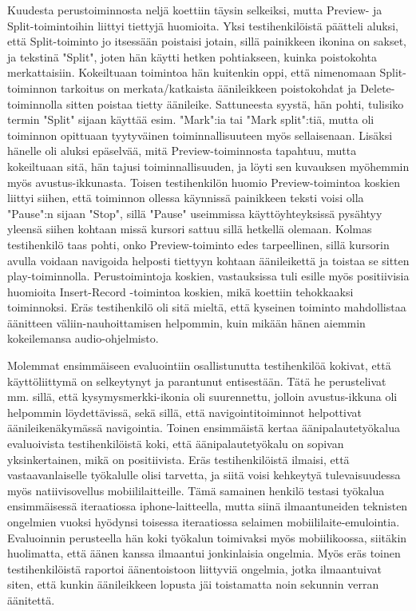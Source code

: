 \documentclass[utf8]{gradu3}
\begin{document}
Kuudesta perustoiminnosta neljä koettiin täysin selkeiksi, mutta Preview- ja Split-toimintoihin liittyi tiettyjä huomioita. Yksi testihenkilöistä päätteli aluksi, että Split-toiminto jo itsessään  poistaisi jotain, sillä painikkeen ikonina on sakset, ja tekstinä "Split", joten hän käytti hetken pohtiakseen, kuinka poistokohta merkattaisiin. Kokeiltuaan toimintoa hän kuitenkin oppi, että nimenomaan Split-toiminnon tarkoitus on merkata/katkaista äänileikkeen poistokohdat ja Delete-toiminnolla sitten poistaa tietty äänileike. Sattuneesta syystä, hän pohti, tulisiko termin "Split" sijaan käyttää esim. "Mark":ia tai "Mark split":tiä, mutta oli toiminnon opittuaan tyytyväinen toiminnallisuuteen myös sellaisenaan. Lisäksi hänelle oli aluksi epäselvää, mitä Preview-toiminnosta tapahtuu, mutta kokeiltuaan sitä, hän tajusi toiminnallisuuden, ja löyti sen kuvauksen myöhemmin myös avustus-ikkunasta. Toisen testihenkilön huomio Preview-toimintoa koskien liittyi siihen, että toiminnon ollessa käynnissä painikkeen teksti voisi olla "Pause":n sijaan "Stop", sillä "Pause" useimmissa käyttöyhteyksissä pysähtyy yleensä siihen kohtaan missä kursori sattuu sillä hetkellä olemaan. Kolmas testihenkilö taas pohti, onko Preview-toiminto edes tarpeellinen, sillä kursorin avulla voidaan navigoida helposti tiettyyn kohtaan äänileikettä ja toistaa se sitten play-toiminnolla. Perustoimintoja koskien, vastauksissa tuli esille myös positiivisia huomioita Insert-Record -toimintoa koskien, mikä koettiin tehokkaaksi toiminnoksi. Eräs testihenkilö oli sitä mieltä, että kyseinen toiminto mahdollistaa äänitteen väliin-nauhoittamisen helpommin, kuin mikään hänen aiemmin kokeilemansa audio-ohjelmisto.

Molemmat ensimmäiseen evaluointiin osallistunutta testihenkilöä kokivat, että käyttöliittymä on selkeytynyt ja parantunut entisestään. Tätä he perustelivat mm. sillä, että kysymysmerkki-ikonia oli suurennettu, jolloin avustus-ikkuna oli helpommin löydettävissä, sekä sillä, että navigointitoiminnot helpottivat äänileikenäkymässä navigointia. Toinen ensimmäistä kertaa äänipalautetyökalua evaluoivista testihenkilöistä koki, että äänipalautetyökalu on sopivan yksinkertainen, mikä on positiivista. Eräs testihenkilöistä ilmaisi, että vastaavanlaiselle työkalulle olisi tarvetta, ja siitä voisi kehkeytyä tulevaisuudessa myös natiivisovellus mobiililaitteille. Tämä samainen henkilö testasi työkalua ensimmäisessä iteraatiossa iphone-laitteella, mutta siinä ilmaantuneiden teknisten ongelmien vuoksi hyödynsi toisessa iteraatiossa selaimen mobiililaite-emulointia. Evaluoinnin perusteella hän koki työkalun toimivaksi myös mobiilikoossa, siitäkin huolimatta, että äänen kanssa ilmaantui jonkinlaisia ongelmia. Myös eräs toinen testihenkilöistä raportoi äänentoistoon liittyviä ongelmia, jotka ilmaantuivat siten, että kunkin äänileikkeen lopusta jäi toistamatta noin sekunnin verran äänitettä.
\end{document}
